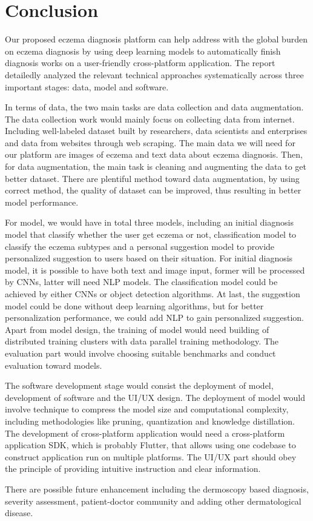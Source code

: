 \section{Conclusion}
Our proposed eczema diagnosis platform can help address with the global burden on eczema diagnosis by using deep learning models to automatically finish diagnosis works on a user-friendly cross-platform application. The report detailedly analyzed the relevant technical approaches systematically across three important stages: data, model and software.

In terms of data, the two main tasks are data collection and data augmentation. The data collection work would mainly focus on collecting data from internet. Including well-labeled dataset built by researchers, data scientists and enterprises and data from websites through web scraping. The main data we will need for our platform are images of eczema and text data about eczema diagnosis. Then, for data augmentation, the main task is cleaning and augmenting the data to get better dataset. There are plentiful method toward data augmentation, by using correct method, the quality of dataset can be improved, thus resulting in better model performance.

For model, we would have in total three models, including an initial diagnosis model that classify whether the user get eczema or not, classification model to classify the eczema subtypes and a personal suggestion model to provide personalized suggestion to users based on their situation. For initial diagnosis model, it is possible to have both text and image input, former will be processed by CNNs, latter will need NLP models. The classification model could be achieved by either CNNs or object detection algorithms. At last, the suggestion model could be done without deep learning algorithms, but for better personalization performance, we could add NLP to gain personalized suggestion. Apart from model design, the training of model would need building of distributed training clusters with data parallel training methodology. The evaluation part would involve choosing suitable benchmarks and conduct evaluation toward models.

The software development stage would consist the deployment of model, development of software and the UI/UX design. The deployment of model would involve technique to compress the model size and computational complexity, including methodologies like pruning, quantization and knowledge distillation. The development of cross-platform application would need a cross-platform application SDK, which is probably Flutter, that allows using one codebase to construct application run on multiple platforms. The UI/UX part should obey the principle of providing intuitive instruction and clear information.

There are possible future enhancement including the dermoscopy based diagnosis, severity assessment, patient-doctor community and adding other dermatological disease. 